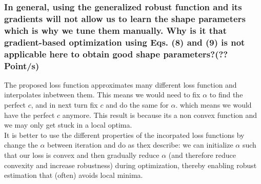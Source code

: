 \subsubsection{In general, using the generalized robust function and its gradients will not allow us to learn the shape parameters which is why we tune them manually. Why is it that gradient-based optimization using Eqs. (8) and (9) is not applicable here to obtain good shape parameters?(?? Point/s)}
The proposed loss function approximates many different loss function and interpolates inbetween them. This means we would need to fix $\alpha$ to find the perfect $c$, and in next turn fix $c$ and do the same for $\alpha$. which means we would have the perfect $c$ anymore. This result is because its a non convex function and we may only get stuck in a local optima.\\ It is better to use the different properties of the incorpated loss functions by change the $\alpha$ between iteration and do as thex describe: we can initialize $\alpha$  such that our loss is convex and then gradually reduce $\alpha$  (and therefore reduce convexity and increase robustness) during optimization, thereby enabling robust estimation that (often) avoids local minima.\\
